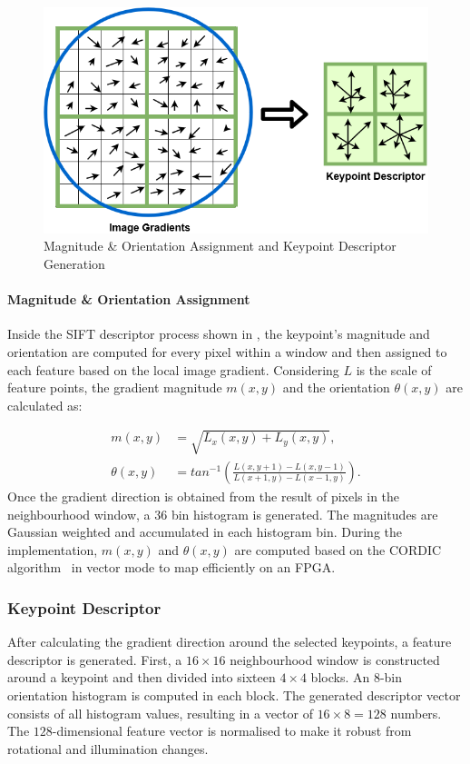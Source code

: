 \begin{figure}[h]
    \centering
     \includegraphics[width=0.6\columnwidth]{Images/keypoint.png}
    \caption{Magnitude \& Orientation Assignment and Keypoint Descriptor Generation}
    \label{fig:Descriptor Generation}
\end{figure}

\paragraph*{Magnitude \& Orientation Assignment}
Inside the SIFT descriptor process shown in , the keypoint’s magnitude and orientation are computed for every pixel within a window and then assigned to each feature based on the local image gradient. Considering $L$ is the scale of  feature points, the gradient magnitude $m(x,y)$ and the orientation $\theta (x,y)$ are calculated as: 

\begin{align}
    m(x,y) &=\sqrt{L_{x}(x,y)+L_{y}(x,y)}, \\
    \theta (x,y) &=tan^{-1}\left ( \frac{L(x,y+1)-L(x,y-1)}{L(x+1,y)-L(x-1,y)} \right).
    \label{eq:SIFT5}
\end{align}
Once the gradient direction is obtained from the result of pixels in the neighbourhood window, a $36$ bin histogram is generated. The magnitudes are Gaussian weighted and accumulated in each histogram bin. During the implementation, $m(x,y)$ and $\theta (x,y)$ are computed based on the CORDIC algorithm~\cite{andraka1998survey} in vector mode to map efficiently on an FPGA.


\subsubsection*{Keypoint Descriptor}
After calculating the gradient direction around the selected keypoints, a feature descriptor is generated. First, a $16\times16$ neighbourhood window is constructed around a keypoint and then divided into sixteen $4\times4$ blocks. An $8$-bin orientation histogram is computed in each block. The generated descriptor vector consists of all histogram values, resulting in a vector of $16 \times 8 = 128$ numbers. The $128$-dimensional feature vector is normalised to make it robust from rotational and illumination changes.


